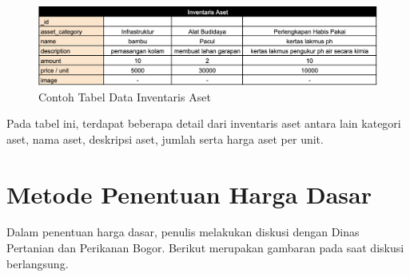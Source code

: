 \begin{spacing}{1.5}
\begin{enumerate}
	\begin{figure}[H]
		\centering
		\includegraphics[width=1\textwidth]{gambar/tabel_inventaris_aset.png}
		\caption{Contoh Tabel Data Inventaris Aset}
	\end{figure}	

	Pada tabel ini, terdapat beberapa detail dari inventaris aset antara lain kategori aset, nama aset, deskripsi aset, jumlah serta harga aset per unit.

\end{enumerate}

\section{Metode Penentuan Harga Dasar}

Dalam penentuan harga dasar, penulis melakukan diskusi dengan Dinas Pertanian dan Perikanan Bogor. Berikut merupakan gambaran pada saat diskusi berlangsung.



\end{spacing}
